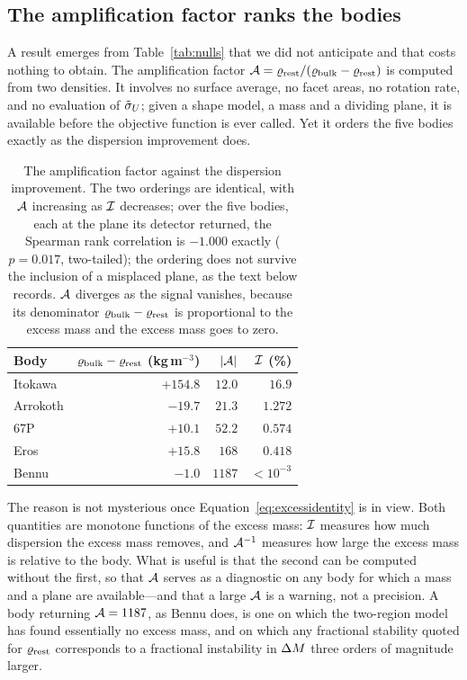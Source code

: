 \subsection{The amplification factor ranks the bodies}
\label{sec:nulls:amplification}

A result emerges from Table~\ref{tab:nulls} that we did not anticipate
and that costs nothing to obtain. The amplification factor
$\mathcal{A} = \varrho_{\mathrm{rest}}/(\varrho_{\mathrm{bulk}}-\varrho_{\mathrm{rest}})$ is computed from two
densities. It involves no surface average, no facet areas, no rotation
rate, and no evaluation of $\tilde{\sigma}_{U}$; given a shape model, a mass and a
dividing plane, it is available before the objective function is ever
called. Yet it orders the five bodies exactly as the dispersion
improvement does.

\begin{table}[htbp]
\centering
\small
\caption{The amplification factor against the dispersion improvement. The
two orderings are identical, with $\mathcal{A}$ increasing as $\mathcal{I}$
decreases; over the five bodies, each at the plane its
detector returned, the Spearman rank correlation is $-1.000$ exactly
($p = 0.017$, two-tailed); the ordering does not survive the inclusion of a
misplaced plane, as the text below records. $\mathcal{A}$ diverges as the
signal vanishes, because its denominator $\varrho_{\mathrm{bulk}} - \varrho_{\mathrm{rest}}$ is
proportional to the excess mass and the excess mass goes to zero.}
\label{tab:amplification}
\setlength{\tabcolsep}{10pt}
\begin{tabular}{lrrr}
\toprule
Body & $\varrho_{\mathrm{bulk}}-\varrho_{\mathrm{rest}}$ (kg\,m$^{-3}$) & $\lvert\mathcal{A}\rvert$
 & $\mathcal{I}$ (\%) \\
\midrule
Itokawa  & $+154.8$ & $12.0$   & $16.9$ \\
Arrokoth & $-19.7$  & $21.3$   & $1.272$ \\
67P      & $+10.1$  & $52.2$   & $0.574$ \\
Eros     & $+15.8$  & $168$    & $0.418$ \\
Bennu    & $-1.0$   & $1187$   & $<10^{-3}$ \\
\bottomrule
\end{tabular}
\end{table}

The reason is not mysterious once
Equation~\eqref{eq:excessidentity} is in view. Both quantities are
monotone functions of the excess mass: $\mathcal{I}$ measures how much
dispersion the excess mass removes, and $\mathcal{A}^{-1}$ measures how large
the excess mass is relative to the body. What is useful is that the
second can be computed without the first, so that $\mathcal{A}$ serves as a
diagnostic on any body for which a mass and a plane are available---and
that a large $\mathcal{A}$ is a warning, not a precision. A body returning
$\mathcal{A} = 1187$, as Bennu does, is one on which the two-region model has
found essentially no excess mass, and on which any fractional stability
quoted for $\varrho_{\mathrm{rest}}$ corresponds to a fractional instability in
$\Delta M$ three orders of magnitude larger.

